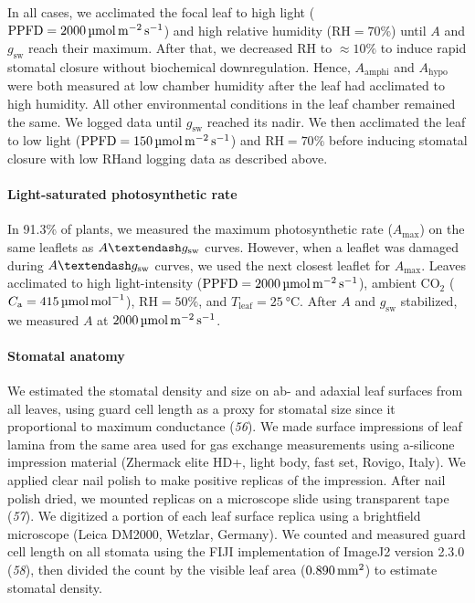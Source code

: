 \documentclass[
  letterpaper,
  DIV=11,
  numbers=noendperiod]{scrartcl}
\let\oldparagraph\paragraph
\renewcommand{\paragraph}[1]{\oldparagraph{#1}\mbox{}}
\newcommand{\Aamphi}{$A_{\mathrm{amphi}}$}
\newcommand{\Ahypo}{$A_{\mathrm{hypo}}$}
\newcommand{\agcurve}{$A \textendash g_\text{sw}$}
\newcommand{\caequals}[1]{$C_\mathrm{a} = \qty{#1}{\micro\mol\raiseto{-1}\mol}$}
\newcommand{\gsw}{$g_\text{sw}$}
\newcommand{\ppfdequals}[1]{$\mathrm{PPFD} = \qty{#1}{\micro\mol\raiseto{-2}\meter\raiseto{-1}\second}$}
\newcommand{\rh}{$\mathrm{RH}$}
\newcommand{\rhequals}[1]{$\mathrm{RH} = #1\%$}
\newcommand{\tleafequals}[1]{$T_\mathrm{leaf} = \qty{#1}{\degreeCelsius}$}
\begin{document}
In all cases, we acclimated the focal leaf to high light
(\ppfdequals{2000}) and high relative humidity (\rhequals{70}) until
\(A\) and \gsw{} reach their maximum. After that, we decreased \rh{} to
\(\approx 10\%\) to induce rapid stomatal closure without biochemical
downregulation. Hence, \Aamphi{} and \Ahypo{} were both measured at low
chamber humidity after the leaf had acclimated to high humidity. All
other environmental conditions in the leaf chamber remained the same. We
logged data until \gsw{} reached its nadir. We then acclimated the leaf
to low light (\ppfdequals{150}) and \rhequals{70} before inducing
stomatal closure with low \rh and logging data as described above.

\paragraph{Light-saturated photosynthetic
rate}\label{light-saturated-photosynthetic-rate}

In 91.3\% of plants, we measured the maximum photosynthetic rate
(\(A_\mathrm{max}\)) on the same leaflets as \agcurve{} curves. However,
when a leaflet was damaged during \agcurve{} curves, we used the next
closest leaflet for \(A_\mathrm{max}\). Leaves acclimated to high
light-intensity (\ppfdequals{2000}), ambient CO\(_2\) (\caequals{415}),
\rhequals{50}, and \tleafequals{25}. After \(A\) and \gsw{} stabilized,
we measured \(A\) at
\(\qty{2000}{\micro\mol\raiseto{-2}\meter\raiseto{-1}\second}\).

\paragraph{Stomatal anatomy}\label{stomatal-anatomy}

We estimated the stomatal density and size on ab- and adaxial leaf
surfaces from all leaves, using guard cell length as a proxy for
stomatal size since it proportional to maximum conductance (\emph{56}).
We made surface impressions of leaf lamina from the same area used for
gas exchange measurements using a-silicone impression material (Zhermack
elite HD+, light body, fast set, Rovigo, Italy). We applied clear nail
polish to make positive replicas of the impression. After nail polish
dried, we mounted replicas on a microscope slide using transparent tape
(\emph{57}). We digitized a portion of each leaf surface replica using a
brightfield microscope (Leica DM2000, Wetzlar, Germany). We counted and
measured guard cell length on all stomata using the FIJI implementation
of ImageJ2 version 2.3.0 (\emph{58}), then divided the count by the
visible leaf area (\(\qty{0.890}{\raiseto{2}\milli\meter}\)) to estimate
stomatal density.
\end{document}
